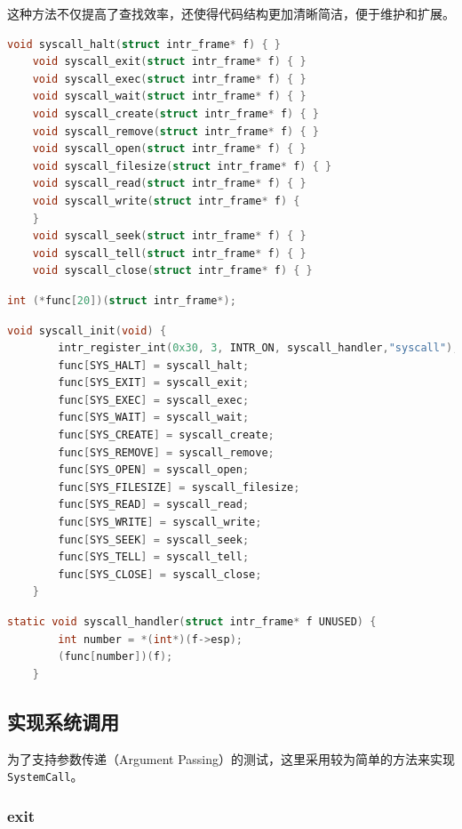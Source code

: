 \documentclass{article}
\begin{document}
这种方法不仅提高了查找效率，还使得代码结构更加清晰简洁，便于维护和扩展。

\begin{lstlisting}[language=C]
	void syscall_halt(struct intr_frame* f) { } 
	void syscall_exit(struct intr_frame* f) { } 
	void syscall_exec(struct intr_frame* f) { } 
	void syscall_wait(struct intr_frame* f) { } 
	void syscall_create(struct intr_frame* f) { } 
	void syscall_remove(struct intr_frame* f) { } 
	void syscall_open(struct intr_frame* f) { } 
	void syscall_filesize(struct intr_frame* f) { } 
	void syscall_read(struct intr_frame* f) { } 
	void syscall_write(struct intr_frame* f) {
	} 
	void syscall_seek(struct intr_frame* f) { } 
	void syscall_tell(struct intr_frame* f) { } 
	void syscall_close(struct intr_frame* f) { }
\end{lstlisting}

\begin{lstlisting}[language=C]
	int (*func[20])(struct intr_frame*);
\end{lstlisting}

\begin{lstlisting}[language=C]
	void syscall_init(void) { 
		intr_register_int(0x30, 3, INTR_ON, syscall_handler,"syscall"); 
		func[SYS_HALT] = syscall_halt; 
		func[SYS_EXIT] = syscall_exit; 
		func[SYS_EXEC] = syscall_exec; 
		func[SYS_WAIT] = syscall_wait; 
		func[SYS_CREATE] = syscall_create; 
		func[SYS_REMOVE] = syscall_remove; 
		func[SYS_OPEN] = syscall_open; 
		func[SYS_FILESIZE] = syscall_filesize; 
		func[SYS_READ] = syscall_read; 
		func[SYS_WRITE] = syscall_write; 
		func[SYS_SEEK] = syscall_seek; 
		func[SYS_TELL] = syscall_tell; 
		func[SYS_CLOSE] = syscall_close; 
	}
\end{lstlisting}

\begin{lstlisting}[language=C]
	static void syscall_handler(struct intr_frame* f UNUSED) { 
		int number = *(int*)(f->esp); 
		(func[number])(f); 
	}
\end{lstlisting}

\subsection{实现系统调用}

为了支持参数传递（Argument Passing）的测试，这里采用较为简单的方法来实现\texttt{SystemCall}。

\subsubsection{exit}
\end{document}

